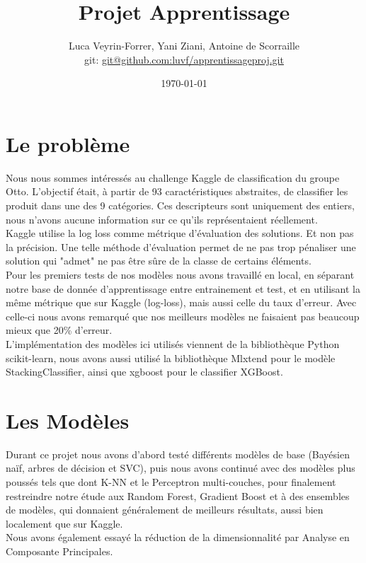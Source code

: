 \documentclass[twocolumn,10pt]{article}
\begin{document}
\title{Projet Apprentissage}
\author{Luca Veyrin-Forrer, Yani Ziani, Antoine de Scorraille\\
git: \url{git@github.com:luvf/apprentissageproj.git}}
\date{\today}
\maketitle


\section{Le problème}

    Nous nous sommes intéressés au challenge Kaggle de classification du groupe Otto. L'objectif était, à partir de 93 caractéristiques abstraites, de classifier les produit dans une des 9 catégories. Ces descripteurs sont uniquement des entiers, nous n'avons aucune information sur ce qu'ils représentaient réellement.\\ 
    Kaggle utilise la log loss comme métrique d'évaluation des solutions. Et non pas la précision. Une telle méthode d'évaluation permet de ne pas trop pénaliser une solution qui "admet" ne pas être sûre de la classe de certains éléments.\\
    Pour les premiers tests de nos modèles nous avons travaillé en local, en séparant notre base de donnée d'apprentissage entre entrainement et test, et en utilisant la même métrique que sur Kaggle (log-loss), mais aussi celle du taux d'erreur. Avec celle-ci nous avons remarqué que nos meilleurs modèles ne faisaient pas beaucoup mieux que 20\% d'erreur.\\
    L'implémentation des modèles ici utilisés viennent de la bibliothèque Python scikit-learn, nous avons aussi utilisé la bibliothèque Mlxtend pour le modèle StackingClassifier, ainsi que xgboost pour le classifier XGBoost.
    
\section{Les Modèles}
    Durant ce projet nous avons d'abord testé différents modèles de base (Bayésien naïf, arbres de décision et SVC), puis nous avons continué avec des modèles plus poussés tels que dont K-NN et le Perceptron multi-couches, pour finalement restreindre notre étude aux Random Forest, Gradient Boost et à des ensembles de modèles, qui donnaient généralement de meilleurs résultats, aussi bien localement que sur Kaggle.\\
    Nous avons également essayé la réduction de la dimensionnalité par Analyse en Composante Principales. 
    
\end{document}
